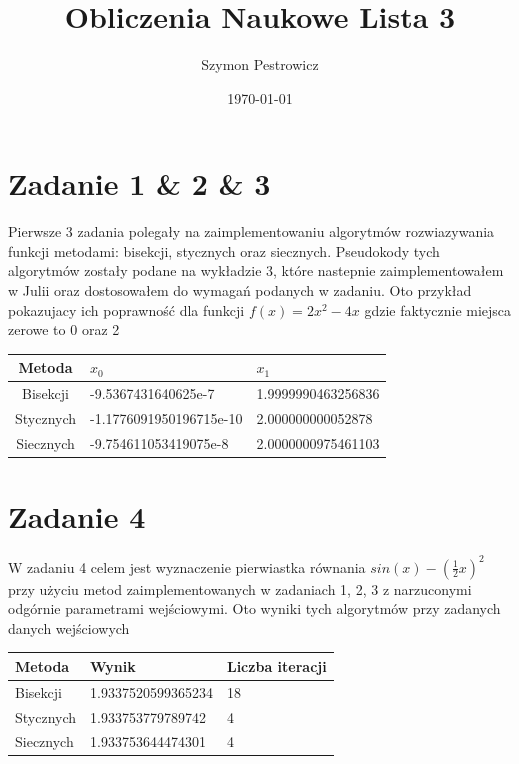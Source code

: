 \documentclass{article} %
\title{Obliczenia Naukowe Lista 3} %
\author{Szymon Pestrowicz} %
\date{\today} %
\begin{document}
	\maketitle %

	\section*{Zadanie 1 \& 2 \& 3} %

		Pierwsze 3 zadania polegały na zaimplementowaniu algorytmów rozwiazywania funkcji metodami: bisekcji, stycznych oraz siecznych. Pseudokody tych algorytmów zostały podane na wykładzie 3, które nastepnie zaimplementowałem w Julii oraz dostosowałem do wymagań podanych w zadaniu. Oto przykład pokazujacy ich poprawność dla funkcji $ f(x) = 2x^2 - 4x $ gdzie faktycznie miejsca zerowe to 0 oraz 2

	\vspace{0.1cm}
		\begin{tabularx}{\textwidth}{|c|X|X|}
		\hline
		Metoda & $x_0$ & $x_1$ \\
		\hline
		Bisekcji & -9.5367431640625e-7 & 1.9999990463256836 \\
		\hline
		Stycznych & -1.1776091950196715e-10 & 2.000000000052878 \\
		\hline
		Siecznych &-9.754611053419075e-8 & 2.0000000975461103 \\
		\hline
		\end{tabularx}
	\vspace{0.1cm}

	\section*{Zadanie 4} %

		W zadaniu 4 celem jest wyznaczenie pierwiastka równania $ sin(x) - (\frac{1}{2}x)^2 $ przy użyciu metod zaimplementowanych w zadaniach 1, 2, 3 z narzuconymi odgórnie parametrami wejściowymi. Oto wyniki tych algorytmów przy zadanych danych wejściowych

	\vspace{0.1cm}
		\begin{tabularx}{\textwidth}{|X|X|X|}
		\hline
		Metoda & Wynik & Liczba iteracji\\
		\hline
		Bisekcji & 1.9337520599365234 & 18\\
		\hline
		Stycznych & 1.933753779789742 & 4\\
		\hline
		Siecznych &1.933753644474301 & 4\\
		\hline
		\end{tabularx}
	\vspace{0.1cm}
\end{document}
